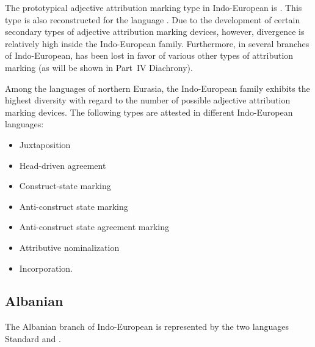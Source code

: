 The prototypical adjective attribution marking type in Indo-European is . This type is also reconstructed for the  language \citep{decsy1991,watkins1998}. Due to the development of certain secondary types of adjective attribution marking devices, however, divergence is relatively high inside the Indo-European family. Furthermore, in several branches of Indo-European,  has been lost in favor of various other types of attribution marking (as will be shown in Part~IV Diachrony).

Among the languages of northern Eurasia, the Indo-European family exhibits the highest diversity with regard to the number of possible adjective attribution marking devices. The following types are attested in different Indo-European languages:
\begin{itemize}
\item Juxtaposition
\item Head\hyp{}driven agreement
\item Construct-state marking
\item Anti\hyp{}construct state marking
\item Anti\hyp{}construct state agreement marking
\item Attributive nominalization
\item Incorporation.
\end{itemize}

\subsection{Albanian} \label{albanian synchr}
The Albanian branch of Indo-European is represented by the two languages Standard  and .

